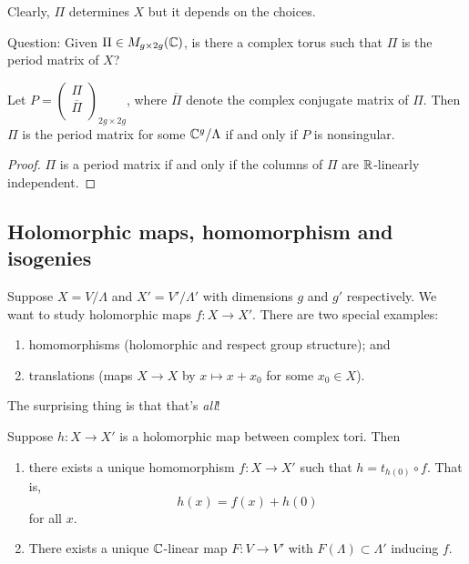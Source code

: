 Clearly, $\Pi$ determines $X$ but it depends on the choices. 

Question: Given $\Pi\in M_{g\times 2g}({\mathbb C})$, is there a complex torus such that $\Pi$ is the period matrix of $X$? 

\begin{theorem}
Let $P=\left(
\begin{array}{c}
\Pi\\
\overline{\Pi}\\
\end{array}
\right)_{2g\times 2g}$, where $\overline{\Pi}$ denote the complex conjugate matrix of $\Pi$. Then $\Pi$ is the period matrix for some ${\mathbb C}^g/\Lambda$ if and only if $P$ is nonsingular. 
\end{theorem}

\begin{proof}
$\Pi$ is a period matrix if and only if the columns of $\Pi$ are ${\mathbb R}$-linearly independent. 
\end{proof}

\subsection{Holomorphic maps, homomorphism and isogenies}
Suppose $X=V/\Lambda$ and $X'=V'/\Lambda'$ with dimensions $g$ and $g'$ respectively. We want to study holomorphic maps $f:X\to X'$. There are two special examples:

\begin{enumerate}
\item homomorphisms (holomorphic and respect group structure); and
\item translations (maps $X\to X$ by $x\mapsto x+x_0$ for some $x_0\in X$).
\end{enumerate}

The surprising thing is that that's \emph{all}! 

\begin{theorem}
Suppose $h:X\to X'$ is a holomorphic map between complex tori. Then 
\begin{enumerate}
\item there exists a unique homomorphism $f:X\to X'$ such that $h=t_{h(0)}\circ f$. That is,
$$h(x)=f(x)+h(0)$$
for all $x$.
\item There exists a unique ${\mathbb C}$-linear map $F:V\to V'$ with $F(\Lambda)\subset \Lambda'$ inducing $f$. 
\end{enumerate}
\end{theorem}



